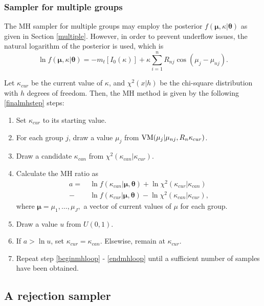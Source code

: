 \documentclass[bib]{ba/ba}
\begin{document}
\subsubsection{Sampler for multiple groups \label{MHmulti}}

The MH sampler for multiple groups may employ the posterior $f(\boldsymbol\mu, \kappa \vert \boldsymbol\theta)$ as given in Section \ref{multiple}. However, in order to prevent underflow issues, the natural logarithm of the posterior is used, which is $$ \ln f(\boldsymbol{\mu}, \kappa \vert \boldsymbol\theta) = - m_t  \left[  I_0(\kappa)\right] +  \kappa \sum_{i=1}^{n} R_{nj} \cos(\mu_{j} - \mu_{nj}). $$ 

Let $\kappa_{cur}$ be the current value of $\kappa$, and $\chi^2(x \vert h)$ be the chi-square distribution with $h$ degrees of freedom. Then, the MH method is given by the following \ref{finalmhstep} steps:


\begin{enumerate}
\item Set $\kappa_{cur}$ to its starting value.
\item For each group $j$, draw a value $\mu_{j}$ from $\textnormal{VM}(\mu_{j} \vert \mu_{nj}, R_n\kappa_{cur})$. \label{beginmhloop}
\item Draw a candidate $\kappa_{can}$ from $\chi^2(\kappa_{can} \vert \kappa_{cur})$. 
\item Calculate the MH ratio as 
\begin{align*}
a = ~& \ln f(\kappa_{can} \vert \boldsymbol{\mu}, \boldsymbol\theta) + \ln  \chi^2(\kappa_{cur} \vert \kappa_{can}) \\
   - & \ln f(\kappa_{cur} \vert \boldsymbol{\mu}, \boldsymbol\theta) - \ln \chi^2(\kappa_{can} \vert \kappa_{cur}),
\end{align*}
where $\boldsymbol\mu = \mu_1, \dots, \mu_J,$ a vector of current values of $\mu$ for each group.
\item Draw a value $u$ from $U(0,1)$. 
\item If $a > \ln u $, set $\kappa_{cur} = \kappa_{can}$. Elsewise, remain at $\kappa_{cur}$. \label{endmhloop}
\item Repeat step \ref{beginmhloop} - \ref{endmhloop} until a sufficient number of samples have been obtained. \label{finalmhstep}
\end{enumerate}


\subsection{A rejection sampler \label{fm}}
\end{document}
